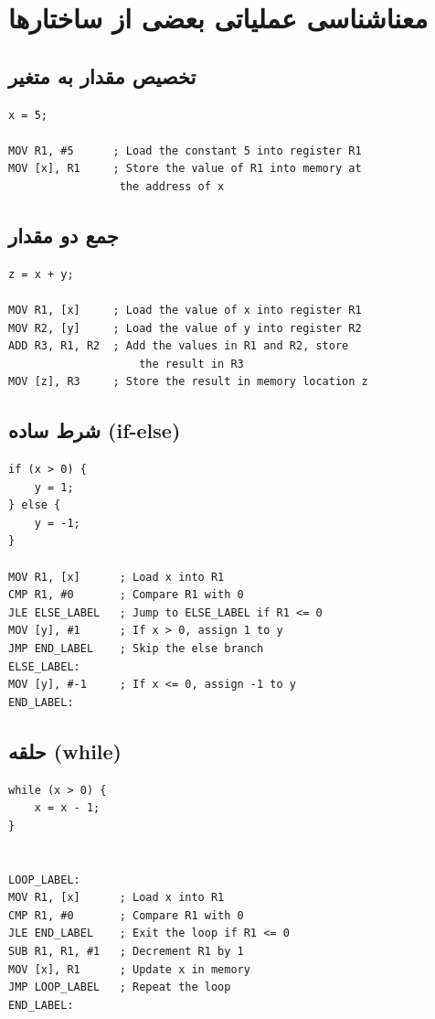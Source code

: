\documentclass{article}
\begin{document}
\section*{معناشناسی عملیاتی بعضی از ساختارها}

\subsection*{تخصیص مقدار به متغیر}
\begin{LTR} %
\begin{lstlisting}
x = 5;

MOV R1, #5      ; Load the constant 5 into register R1
MOV [x], R1     ; Store the value of R1 into memory at
				 the address of x
\end{lstlisting}
\end{LTR}

\subsection*{جمع دو مقدار}
\begin{LTR} %
\begin{lstlisting}
z = x + y;

MOV R1, [x]     ; Load the value of x into register R1
MOV R2, [y]     ; Load the value of y into register R2
ADD R3, R1, R2  ; Add the values in R1 and R2, store 
					the result in R3
MOV [z], R3     ; Store the result in memory location z
\end{lstlisting}
\end{LTR}

\subsection*{شرط ساده (if-else)}
\begin{LTR} %
\begin{lstlisting}
if (x > 0) {
    y = 1;
} else {
    y = -1;
}

MOV R1, [x]      ; Load x into R1
CMP R1, #0       ; Compare R1 with 0
JLE ELSE_LABEL   ; Jump to ELSE_LABEL if R1 <= 0
MOV [y], #1      ; If x > 0, assign 1 to y
JMP END_LABEL    ; Skip the else branch
ELSE_LABEL:
MOV [y], #-1     ; If x <= 0, assign -1 to y
END_LABEL:
\end{lstlisting}
\end{LTR}


\subsection*{حلقه (while)}
\begin{LTR} %
\begin{lstlisting}
while (x > 0) {
    x = x - 1;
}


LOOP_LABEL:
MOV R1, [x]      ; Load x into R1
CMP R1, #0       ; Compare R1 with 0
JLE END_LABEL    ; Exit the loop if R1 <= 0
SUB R1, R1, #1   ; Decrement R1 by 1
MOV [x], R1      ; Update x in memory
JMP LOOP_LABEL   ; Repeat the loop
END_LABEL:
\end{lstlisting}
\end{LTR}
\end{document}
